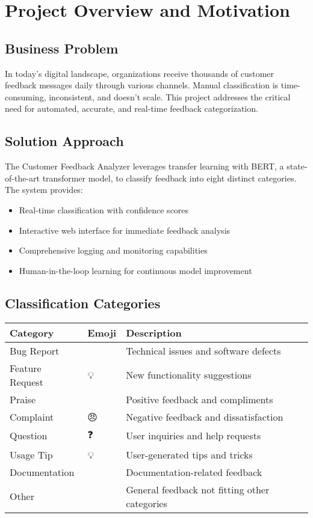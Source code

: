 \documentclass[11pt,a4paper]{article}
\begin{document}
\section{Project Overview and Motivation}

\subsection{Business Problem}
In today's digital landscape, organizations receive thousands of customer feedback messages daily through various channels. Manual classification is time-consuming, inconsistent, and doesn't scale. This project addresses the critical need for automated, accurate, and real-time feedback categorization.

\subsection{Solution Approach}
The Customer Feedback Analyzer leverages transfer learning with BERT, a state-of-the-art transformer model, to classify feedback into eight distinct categories. The system provides:
\begin{itemize}
  \item Real-time classification with confidence scores
  \item Interactive web interface for immediate feedback analysis
  \item Comprehensive logging and monitoring capabilities
  \item Human-in-the-loop learning for continuous model improvement
\end{itemize}

\subsection{Classification Categories}
\begin{longtable}{|l|l|p{8cm}|}
\hline
\textbf{Category} & \textbf{Emoji} & \textbf{Description} \\
\hline
Bug Report & 🐞 & Technical issues and software defects \\
Feature Request & 💡 & New functionality suggestions \\
Praise & 🎉 & Positive feedback and compliments \\
Complaint & 😠 & Negative feedback and dissatisfaction \\
Question & ❓ & User inquiries and help requests \\
Usage Tip & 💡 & User-generated tips and tricks \\
Documentation & 📄 & Documentation-related feedback \\
Other & 🔖 & General feedback not fitting other categories \\
\hline
\end{longtable}
\end{document}
